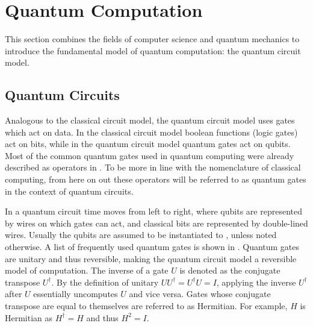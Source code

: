 \section{Quantum Computation}
This section combines the fields of computer science and quantum mechanics to introduce the fundamental model of quantum computation: the quantum circuit model.

\subsection{Quantum Circuits}
Analogous to the classical circuit model, the quantum circuit model uses gates which act on data.
In the classical circuit model boolean functions (logic gates) act on bits, while in the quantum circuit model quantum gates act on qubits.
Most of the common quantum gates used in quantum computing were already described as operators in .
To be more in line with the nomenclature of classical computing, from here on out these operators will be referred to as quantum gates in the context of quantum circuits.

In a quantum circuit time moves from left to right, where qubits are represented by wires on which gates can act, and classical bits are represented by double-lined wires.
Usually the qubits are assumed to be instantiated to , unless noted otherwise.
A list of frequently used quantum gates is shown in .
Quantum gates are unitary and thus reversible, making the quantum circuit model a reversible model of computation.
The inverse of a gate $U$ is denoted as the conjugate transpose $U^\dagger$.
By the definition of unitary $UU^\dagger = U^\dagger U = I$, applying the inverse $U^\dagger$ after $U$ essentially uncomputes $U$ and vice versa.
Gates whose conjugate transpose are equal to themselves are referred to as Hermitian.
For example, $H$ is Hermitian as $H^\dagger = H$ and thus $H^2 = I$.
 
